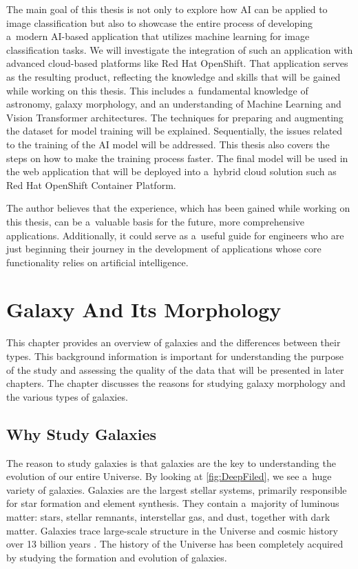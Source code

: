 The main goal of this thesis is not only to explore how AI can be applied to image classification but also to showcase the entire process of developing a~modern AI-based application that utilizes machine learning for image classification tasks. We will investigate the integration of such an application with advanced cloud-based platforms like Red Hat OpenShift. That application serves as the resulting product, reflecting the knowledge and skills that will be gained while working on this thesis. This includes a~fundamental knowledge of astronomy, galaxy morphology, and an understanding of Machine Learning and Vision Transformer architectures. The techniques for preparing and augmenting the dataset for model training will be explained. Sequentially, the issues related to the training of the AI model will be addressed. This thesis also covers the steps on how to make the training process faster. The final model will be used in the web application that will be deployed into a~hybrid cloud solution such as Red Hat OpenShift Container Platform. 

The author believes that the experience, which has been gained while working on this thesis, can be a~valuable basis for the future, more comprehensive applications. Additionally, it could serve as a~useful guide for engineers who are just beginning their journey in the development of applications whose core functionality relies on artificial intelligence.


\chapter{Galaxy And Its Morphology}

This chapter provides an overview of galaxies and the differences between their types. This background information is important for understanding the purpose of the study and assessing the quality of the data that will be presented in later chapters. The chapter discusses the reasons for studying galaxy morphology and the various types of galaxies.

\section{Why Study Galaxies}

The reason to study galaxies is that galaxies are the key to understanding the evolution of our entire Universe. By looking at \autoref{fig:DeepFiled}, we see a~huge variety of galaxies. Galaxies are the largest stellar systems, primarily responsible for star formation and element synthesis. They contain a~majority of luminous matter: stars, stellar remnants, interstellar gas, and dust, together with dark matter. Galaxies trace large-scale structure in the Universe and cosmic history over 13 billion years \cite{Hickson2016ASTR505}. The history of the Universe has been completely acquired by studying the formation and evolution of galaxies.

